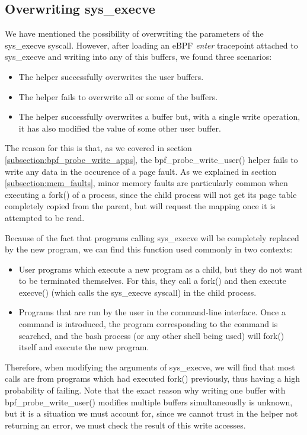 \subsection{Overwriting sys\_execve} \label{subsection:sys_execve_writing}
We have mentioned the possibility of overwriting the parameters of the sys\_execve syscall. However, after loading an eBPF \textit{enter} tracepoint attached to sys\_execve and writing into any of this buffers, we found three scenarios:
\begin{itemize}
\item The helper successfully overwrites the user buffers.
\item The helper fails to overwrite all or some of the buffers.
\item The helper successfully overwrites a buffer but, with a single write operation, it has also modified the value of some other user buffer.
\end{itemize}

The reason for this is that, as we covered in section \ref{subsection:bpf_probe_write_apps}, the bpf\_probe\_write\_user() helper fails to write any data in the occurence of a page fault. As we explained in section \ref{subsection:mem_faults}, minor memory faults are particularly common when executing a fork() of a process, since the child process will not get its page table completely copied from the parent, but will request the mapping once it is attempted to be read.

Because of the fact that programs calling sys\_execve will be completely replaced by the new program, we can find this function used commonly in two contexts:
\begin{itemize}
\item User programs which execute a new program as a child, but they do not want to be terminated themselves. For this, they call a fork() and then execute execve() (which calls the sys\_execve syscall) in the child process.
\item Programs that are run by the user in the command-line interface. Once a command is introduced, the program corresponding to the command is searched, and the bash process (or any other shell being used) will fork() itself and execute the new program.
\end{itemize}

Therefore, when modifying the arguments of sys\_execve, we will find that most calls are from programs which had executed fork() previously, thus having a high probability of failing. Note that the exact reason why writing one buffer with bpf\_probe\_write\_user() modifies multiple buffers simultaneouslly is unknown, but it is a situation we must account for, since we cannot trust in the helper not returning an error, we must check the result of this write accesses.

